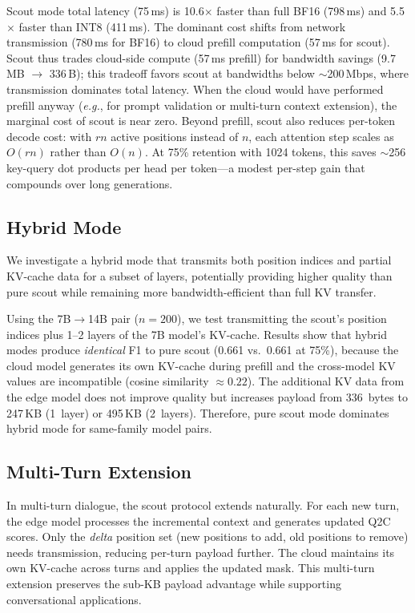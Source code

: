 \documentclass[journal]{IEEEtran}
\newcommand{\eg}{\textit{e.g.}\xspace}
\newcommand{\QtoC}{\textsc{Q2C}\xspace}
\begin{document}
Scout mode total latency (75\,ms) is 10.6$\times$ faster than full BF16 (798\,ms) and 5.5$\times$ faster than INT8 (411\,ms).
The dominant cost shifts from network transmission (780\,ms for BF16) to cloud prefill computation (57\,ms for scout).
Scout thus trades cloud-side compute (57\,ms prefill) for bandwidth savings (9.7\,MB $\to$ 336\,B); this tradeoff favors scout at bandwidths below $\sim$200\,Mbps, where transmission dominates total latency.
When the cloud would have performed prefill anyway (\eg, for prompt validation or multi-turn context extension), the marginal cost of scout is near zero.
Beyond prefill, scout also reduces per-token decode cost: with $rn$ active positions instead of $n$, each attention step scales as $O(rn)$ rather than $O(n)$.
At 75\% retention with 1024 tokens, this saves $\sim$256 key-query dot products per head per token---a modest per-step gain that compounds over long generations.

\subsection{Hybrid Mode}

We investigate a hybrid mode that transmits both position indices and partial KV-cache data for a subset of layers, potentially providing higher quality than pure scout while remaining more bandwidth-efficient than full KV transfer.

Using the 7B$\to$14B pair ($n = 200$), we test transmitting the scout's position indices plus 1--2 layers of the 7B model's KV-cache.
Results show that hybrid modes produce \emph{identical} F1 to pure scout (0.661 vs.\ 0.661 at 75\%), because the cloud model generates its own KV-cache during prefill and the cross-model KV values are incompatible (cosine similarity $\approx 0.22$).
The additional KV data from the edge model does not improve quality but increases payload from 336~bytes to 247\,KB (1~layer) or 495\,KB (2~layers).
Therefore, pure scout mode dominates hybrid mode for same-family model pairs.

\subsection{Multi-Turn Extension}

In multi-turn dialogue, the scout protocol extends naturally.
For each new turn, the edge model processes the incremental context and generates updated \QtoC scores.
Only the \emph{delta} position set (new positions to add, old positions to remove) needs transmission, reducing per-turn payload further.
The cloud maintains its own KV-cache across turns and applies the updated mask.
This multi-turn extension preserves the sub-KB payload advantage while supporting conversational applications.
\end{document}
